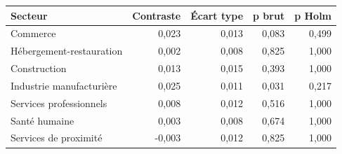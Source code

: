 \begin{tabularx}{\linewidth}{Xrrrr}
\toprule
Secteur & Contraste & Écart type & p brut & p Holm \\
\midrule
Commerce & 0,023 & 0,013 & 0,083 & 0,499 \\
Hébergement-restauration & 0,002 & 0,008 & 0,825 & 1,000 \\
Construction & 0,013 & 0,015 & 0,393 & 1,000 \\
Industrie manufacturière & 0,025 & 0,011 & 0,031 & 0,217 \\
Services professionnels & 0,008 & 0,012 & 0,516 & 1,000 \\
Santé humaine & 0,003 & 0,008 & 0,674 & 1,000 \\
Services de proximité & -0,003 & 0,012 & 0,825 & 1,000 \\
\bottomrule
\end{tabularx}
